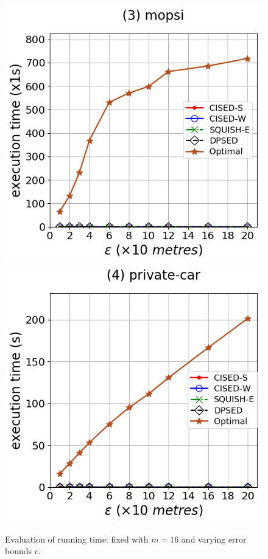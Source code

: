 \begin{figure}[tb!]
\includegraphics[scale = 0.275]{Figures/Exp-opt-time-epsilon-mopsi.png}\hspace{3ex}
\includegraphics[scale = 0.275]{Figures/Exp-opt-time-epsilon-private.png}
\caption{\small Evaluation of running time: fixed with $m=16$ and varying error bounds $\epsilon$.}
\label{fig:time-optimal-epsilon}
\vspace{-1ex}
\end{figure}




